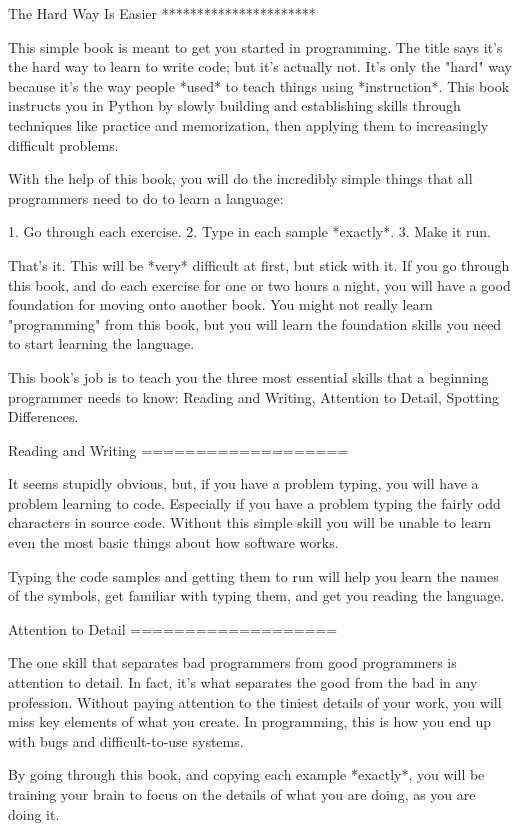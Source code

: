 The Hard Way Is Easier
**********************

This simple book is meant to get you started in programming.  The title says
it's the hard way to learn to write code; but it's actually not.  It's only the
"hard" way because it's the way people *used* to teach things using
*instruction*.  This book instructs you in Python by slowly building and
establishing skills through techniques like practice and memorization, then
applying them to increasingly difficult problems.

With the help of this book, you will do the incredibly simple things that all
programmers need to do to learn a language:

1. Go through each exercise.
2. Type in each sample *exactly*.
3. Make it run.

That's it.  This will be *very* difficult at first, but stick with it.  If you
go through this book, and do each exercise for one or two hours a night, you will
have a good foundation for moving onto another book.  You might not really
learn "programming" from this book, but you will learn the foundation skills you
need to start learning the language.

This book's job is to teach you the three most essential skills that a
beginning programmer needs to know: Reading and Writing, Attention to Detail,
Spotting Differences.


Reading and Writing
===================

It seems stupidly obvious, but, if you have a problem typing, you will have a
problem learning to code.  Especially if you have a problem typing the fairly
odd characters in source code. Without this simple skill you will be unable to
learn even the most basic things about how software works.

Typing the code samples and getting them to run will help you learn the names of
the symbols, get familiar with typing them, and get you reading the language.

Attention to Detail
===================

The one skill that separates bad programmers from good programmers is attention
to detail.  In fact, it's what separates the good from the bad in any profession.
Without paying attention to the tiniest details of your work, you will miss key
elements of what you create.  In programming, this is how you end up
with bugs and difficult-to-use systems.

By going through this book, and copying each example *exactly*, you will be
training your brain to focus on the details of what you are doing, as you are doing it.


